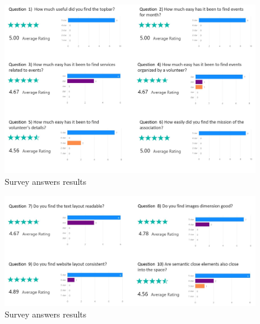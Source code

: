 \begin{figure}[h!]
	\centering
	\begin{minipage}[b]{1\textwidth}
    		\includegraphics[width=\textwidth]{./assets/survey-results.jpg}
		\caption{Survey answers results}
	\end{minipage}
\end{figure}
\FloatBarrier
\begin{figure}[h!]
	\centering
	\begin{minipage}[b]{1\textwidth}
    		\includegraphics[width=\textwidth]{./assets/survey-results-1.jpg}
		\caption{Survey answers results}
	\end{minipage}
\end{figure}
\FloatBarrier
